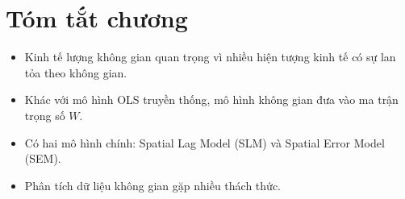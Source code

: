\section{Tóm tắt chương}
\begin{itemize}
    \item Kinh tế lượng không gian quan trọng vì nhiều hiện tượng kinh tế có sự lan tỏa theo không gian.
    \item Khác với mô hình OLS truyền thống, mô hình không gian đưa vào ma trận trọng số $W$.
    \item Có hai mô hình chính: Spatial Lag Model (SLM) và Spatial Error Model (SEM).
    \item Phân tích dữ liệu không gian gặp nhiều thách thức.
\end{itemize}
